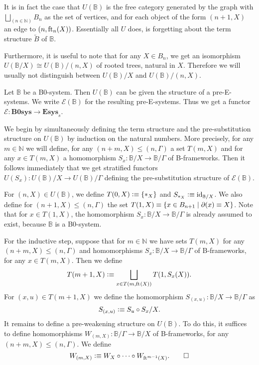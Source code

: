 \begin{rmk} 
It is in fact the case that $U(\mathbb{B})$ is the free category generated by the
graph with $\bigsqcup_{(n\in\mathbb{N})}B_n$ as the set of vertices, and
for each object of the form $(n+1,X)$ an edge to $(n,\eft[n](X))$. 
Essentially all $U$ does, is forgetting about the term structure 
$\tilde{B}$ of $\mathbb{B}$.

Furthermore, it is useful to note that for any $X\in B_n$, we get an 
isomorphism $U(\mathbb{B}/X)\cong  U(\mathbb{B})/(n,X)$ of rooted trees,
natural in $X$. Therefore we will usually not distinguish between $U(\mathbb{B})/X$
and $U(\mathbb{B})/(n,X)$. 
\end{rmk}

\begin{defn}
Let $\mathbb{B}$ be a B0-system. Then $U(\mathbb{B})$ can be given the structure
of a pre-E-systems. We write $\mathcal{E}(\mathbb{B})$ for the resulting
pre-E-systems. Thus we get a functor $\mathcal{E}:\mathbf{B0sys}\to\mathbf{Esys}_s$.
\end{defn}

\begin{constr}
We begin by simultaneously defining the term structure and the pre-substitution
structure on $U(\mathbb{B})$ by induction on the natural numbers. More precisely,
for any $m\in\mathbb{N}$ we will define, for any $(n+m,X)\leq (n,\Gamma)$ a set
$T(m,X)$ and for any $x\in T(m,X)$ a homomorphism 
$S_x:\mathbb{B}/X\to\mathbb{B}/\Gamma$ of B-frameworks. Then it follows
immediately that we get stratified functors $U(S_x):U(\mathbb{B})/X\to U(\mathbb{B})/\Gamma$
defining the pre-substitution structure of $\mathcal{E}(\mathbb{B})$.

For $(n,X)\in U(\mathbb{B})$, we define $T(0,X)\defeq
\{\pt[X]\}$ and $S_{\pt[X]}\defeq \catid{\mathbb{B}/X}$. We also define for
$(n+1,X)\leq (n,\Gamma)$ the set $T(1,X)\jdeq\{x\in B_{n+1}\mid \ebd(x)\jdeq X\}$.
Note that for $x\in T(1,X)$, the homomorphism $S_x:\mathbb{B}/X \to\mathbb{B}/\Gamma$
is already assumed to exist, because $\mathbb{B}$ is a B0-system.

For the inductive step, suppose that for $m\in\mathbb{N}$ we have sets $T(m,X)$
for any $(n+m,X)\leq (n,\Gamma)$ and homomorphisms $S_x:\mathbb{B}/X \to \mathbb{B}/\Gamma$
of B-frameworks, for any $x\in T(m,X)$. Then we define
\begin{equation*}
T(m+1,X)\defeq\bigsqcup_{x\in T(m,\eft(X))} T(1,S_x(X)).
\end{equation*}
For $(x,u)\in T(m+1,X)$ we define the homomorphism $S_{(x,u)}:\mathbb{B}/X\to
\mathbb{B}/\Gamma$ as
\begin{equation*}
S_{(x,u)}\defeq S_u\circ S_x/X.
\end{equation*}
It remains to define a pre-weakening structure on $U(\mathbb{B})$. To do this,
it suffices to define homomorphisms $W_{(m,X)}:\mathbb{B}/\Gamma \to\mathbb{B}/X$
of B-frameworks, for any $(n+m,X)\leq (n,\Gamma)$. We define
\begin{equation*}
W_{(m,X)}\defeq W_X\circ\cdots\circ W_{\eft^{m-1}(X)}.\qedhere
\end{equation*}
\end{constr}

